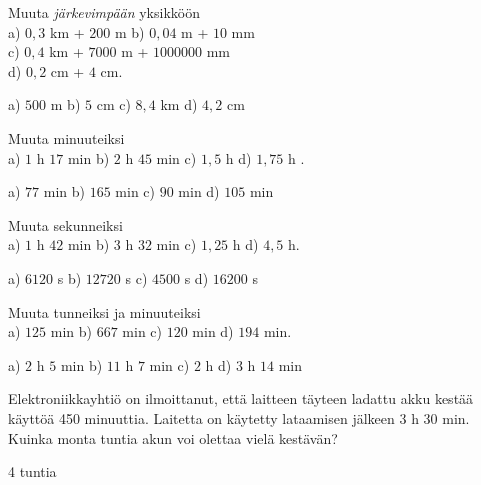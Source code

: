 
\begin{tehtavasivu}

\begin{tehtava}
Muuta \emph{järkevimpään} yksikköön \\
a) $0,3$ km + $200$ m \qquad
b) $0,04$ m + $10$ mm \\
c) $0,4$ km + $7000$ m + $1000000$ mm \\
d) $0,2$ cm + $4$ cm. 
\begin{vastaus}
a) $500$ m \qquad
b) $5$ cm \qquad
c) $8,4$ km \qquad
d) $4,2$ cm
\end{vastaus}
\end{tehtava}

\begin{tehtava}
Muuta minuuteiksi \\
a) $1$ h $17$ min \qquad
b) $2$ h $45$ min \qquad
c) $1,5$ h \qquad
d) $1,75$ h .
\begin{vastaus}
a) $77$ min \qquad
b) $165$ min \qquad
c) $90$ min \qquad
d) $105$ min
\end{vastaus}
\end{tehtava}

\begin{tehtava}
Muuta sekunneiksi \\
a) $1$ h $42$ min \qquad
b) $3$ h $32$ min \qquad
c) $1,25$ h \qquad
d) $4,5$ h.
\begin{vastaus}
a) $6120$ s \qquad
b) $12720$ s \qquad
c) $4500$ s \qquad
d) $16200$ s
\end{vastaus}
\end{tehtava}

\begin{tehtava}
Muuta tunneiksi ja minuuteiksi \\
a) $125$ min \qquad
b) $667$ min \qquad
c) $120$ min \qquad
d) $194$ min.
\begin{vastaus}
a) $2$ h $5$ min \qquad
b) $11$ h $7$ min \qquad
c) $2$ h \qquad
d) $3$ h $14$ min
\end{vastaus}
\end{tehtava}

\begin{tehtava}
Elektroniikkayhtiö on ilmoittanut, että laitteen täyteen ladattu akku kestää käyttöä 450 minuuttia.
Laitetta on käytetty lataamisen jälkeen 3 h 30 min. Kuinka monta tuntia akun voi olettaa vielä kestävän?
\begin{vastaus}
4 tuntia
\end{vastaus}
\end{tehtava}


\end{tehtavasivu}
